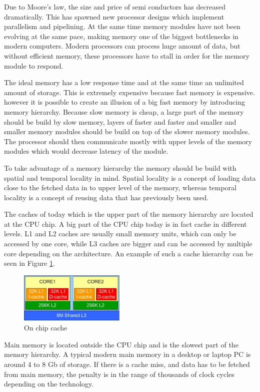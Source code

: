 Due to Moore's law, the size and price of semi conductors has decreased dramatically. This has spawned new processor designs which implement parallelism and pipelining. At the same time memory modules have not been evolving at the same pace, making memory one of the biggest bottlenecks in modern computers. Modern processors can process huge amount of data, but without efficient memory, these processors have to stall in order for the memory module to respond.

The ideal memory has a low response time and at the same time an unlimited amount of storage. This is extremely expensive because fast memory is expensive. however it is possible to create an illusion of a big fast memory by introducing memory hierarchy. Because slow memory is cheap, a large part of the memory should be build by slow memory, layers of faster and faster and smaller and smaller memory modules should be build on top of the slower memory modules. The processor should then communicate mostly with upper levels of the memory modules which would decrease latency of the module.

To take advantage of a memory hierarchy the memory should be build with spatial and temporal locality in mind. Spatial locality is a concept of loading data close to the fetched data in to upper level of the memory, whereas temporal locality is a concept of reusing data that has previously been used.

The caches of today which is the upper part of the memory hierarchy are located at the CPU chip. A big part of the CPU chip today is in fact cache in different levels. L1 and L2 caches are usually small memory units, which can only be accessed by one core, while L3 caches are bigger and can be accessed by multiple core depending on the architecture. An example of such a cache hierarchy can be seen in Figure \ref{cache}.

\begin{figure}[!h] 
\includegraphics[width=0.45\textwidth]{Images/Cache_level.JPG}
\caption{On chip cache}
\label{cache}
\end{figure}


Main memory is located outside the CPU chip and is the slowest part of the memory hierarchy. A typical modern main memory in a desktop or laptop PC is around 4 to 8 Gb of storage. If there is a cache miss, and data has to be fetched from main memory, the penalty is in the range of thousands of clock cycles depending on the technology. 

